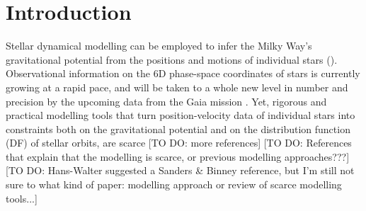 \section{Introduction} \label{sec:intro}

Stellar dynamical modelling can be employed to infer the Milky Way's gravitational potential from the positions and motions of individual stars (\citealt{bin08,bin11b,rix13}). Observational information on the 6D phase-space coordinates of stars is currently growing at a rapid pace, and will be taken to a whole new level in number and precision by the upcoming data from the Gaia mission \citep{2001A&A...369..339P}. Yet, rigorous and practical modelling tools that turn position-velocity data of individual stars into constraints both on the gravitational potential and on the distribution function (DF) of stellar orbits, are scarce \citep{rix13} [TO DO: more references] [TO DO: References that explain that the modelling is scarce, or previous modelling approaches???] [TO DO: Hans-Walter suggested a Sanders \& Binney reference, but I'm still not sure to what kind of paper: modelling approach or review of scarce modelling tools...]







